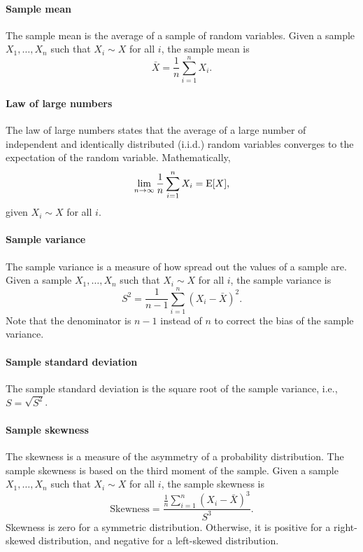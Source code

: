 \paragraph{Sample mean}  The sample mean is the average of a sample of random variables.
Given a sample $X_1, \dots, X_n$ such that $X_i \sim X$ for all $i$, the sample mean is
\begin{equation*}
  \bar{X} = \frac{1}{n} \sum_{i = 1}^n X_i\text{.}
\end{equation*}

\paragraph{Law of large numbers}  The law of large numbers states that the average of
a large number of independent and identically distributed (i.i.d.) random variables converges
to the expectation of the random variable.  Mathematically,
\begin{equation*}
  \lim_{n \rightarrow \infty} \frac{1}{n} \sum_{i = 1}^n X_i = \operatorname{E}[X]\text{,}
\end{equation*}
given $X_i \sim X$ for all $i$.

\paragraph{Sample variance}  The sample variance is a measure of how spread out the
values of a sample are.  Given a sample $X_1, \dots, X_n$ such that $X_i \sim X$ for all
$i$, the sample variance is
\begin{equation*}
  S^2 = \frac{1}{n - 1} \sum_{i = 1}^n (X_i - \bar{X})^2\text{.}
\end{equation*}
Note that the denominator is $n - 1$ instead of $n$ to correct the bias of the sample
variance.

\paragraph{Sample standard deviation}  The sample standard deviation is the square root
of the sample variance, i.e., $S = \sqrt{S^2}$.

\paragraph{Sample skewness}  The skewness is a measure of the asymmetry of a probability
distribution.  The sample skewness is based on the third moment of the sample.  Given a
sample $X_1, \dots, X_n$ such that $X_i \sim X$ for all $i$, the sample skewness is
\begin{equation*}
  \text{Skewness} = \frac{\frac{1}{n} \sum_{i = 1}^n (X_i - \bar{X})^3}{S^3}\text{.}
\end{equation*}
Skewness is zero for a symmetric distribution.  Otherwise, it is positive for a right-skewed distribution,
and negative for a left-skewed distribution.


